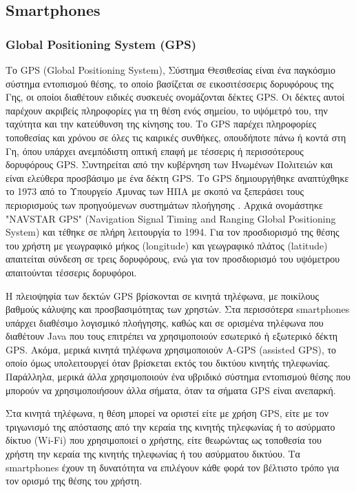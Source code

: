 \documentclass[12pt,twoside,openright]{report}
\begin{document}
\subsection*{ \lt Smartphones\gt}
\subsubsection*{\lt Global Positioning System (GPS)\gt}
Το \lt GPS (Global Positioning System),  Σύστημα Θεσιθεσίας είναι ένα παγκόσμιο σύστημα εντοπισμού θέσης, το οποίο βασίζεται σε εικοσιτέσσερις δορυφόρους της Γης, οι οποίοι διαθέτουν ειδικές συσκευές ονομάζονται δέκτες \lt GPS. \gt Οι δέκτες αυτοί παρέχουν ακριβείς πληροφορίες για τη θέση ενός σημείου, το υψόμετρό του, την ταχύτητα και την κατεύθυνση της κίνησης του.  Το \lt GPS \gt παρέχει πληροφορίες τοποθεσίας και χρόνου σε όλες τις καιρικές συνθήκες, οπουδήποτε πάνω ή κοντά στη Γη, όπου υπάρχει ανεμπόδιστη οπτική επαφή με τέσσερις ή περισσότερους δορυφόρους \lt GPS. \gt Συντηρείται από την κυβέρνηση των Ηνωμένων Πολιτειών και είναι ελεύθερα προσβάσιμο με ένα δέκτη \lt GPS. 
\gt Το \lt GPS \gt δημιουργήθηκε αναπτύχθηκε το 1973  από το Υπουργείο Άμυνας των ΗΠΑ με σκοπό να ξεπεράσει τους περιορισμούς των προηγούμενων συστημάτων πλοήγησης . Αρχικά ονομάστηκε \lt "NAVSTAR GPS" (Navigation Signal Timing and Ranging Global Positioning System) \gt και τέθηκε σε πλήρη λειτουργία το 1994. \cite{gps_wiki} Για τον προσδιορισμό της θέσης του χρήστη με γεωγραφικό μήκος \lt (longitude) \gt και γεωγραφικό πλάτος \lt (latitude) \gt απαιτείται σύνδεση σε τρεις δορυφόρους, ενώ για τον προσδιορισμό του υψόμετρου απαιτούνται τέσσερις δορυφόροι.

Η πλειοψηφία των δεκτών \lt GPS \gt βρίσκονται σε κινητά τηλέφωνα, με ποικίλους βαθμούς κάλυψης και προσβασιμότητας των χρηστών. Στα περισσότερα \lt smartphones \gt υπάρχει διαθέσιμο λογισμικό πλοήγησης, καθώς και σε ορισμένα τηλέφωνα που διαθέτουν \lt Java \gt που τους επιτρέπει να χρησιμοποιούν εσωτερικό ή εξωτερικό δέκτη \lt GPS. \gt Ακόμα, μερικά κινητά τηλέφωνα χρησιμοποιούν \lt A-GPS (assisted GPS), \gt  το οποίο όμως υπολειτουργεί όταν βρίσκεται εκτός του δικτύου κινητής τηλεφωνίας. Παράλληλα, μερικά άλλα χρησιμοποιούν ένα υβριδικό σύστημα εντοπισμού θέσης που μπορούν να χρησιμοποιήσουν άλλα σήματα, όταν τα σήματα \lt GPS \gt είναι ανεπαρκή.\cite{gps_dev}

Στα κινητά τηλέφωνα, η θέση μπορεί να οριστεί είτε με χρήση \lt GPS, \gt είτε με τον τριγωνισμό της απόστασης από την κεραία της κινητής τηλεφωνίας ή το ασύρματο δίκτυο \lt (Wi-Fi) \gt που χρησιμοποιεί ο χρήστης, είτε θεωρώντας ως τοποθεσία του χρήστη την κεραία της κινητής τηλεφωνίας ή του ασύρματου δικτύου. Τα \lt smartphones \gt έχουν τη δυνατότητα να επιλέγουν κάθε φορά τον βέλτιστο τρόπο για τον ορισμό της θέσης του χρήστη.\cite{sensors}
\end{document}
